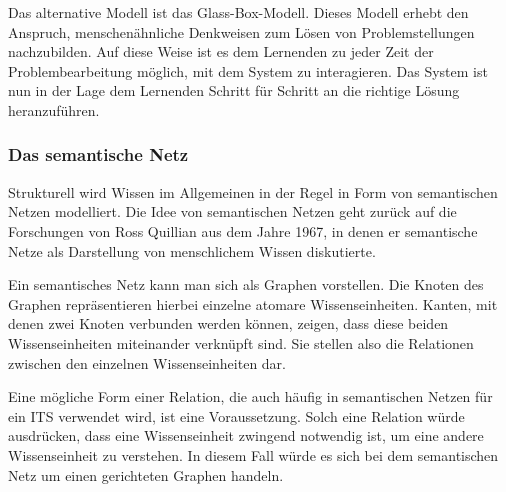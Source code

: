 Das alternative Modell ist das \glqq Glass-Box-Modell\grqq .
Dieses Modell erhebt den Anspruch, menschenähnliche Denkweisen zum Lösen von
Problemstellungen nachzubilden. Auf diese Weise ist es dem Lernenden zu jeder Zeit der
Problembearbeitung möglich, mit dem System zu interagieren. Das System ist nun in der Lage
dem Lernenden Schritt für Schritt an die richtige Lösung heranzuführen.


\subsubsection{Das semantische Netz}

Strukturell wird Wissen im Allgemeinen in der Regel in Form von semantischen Netzen modelliert.
Die Idee von semantischen Netzen geht zurück auf die Forschungen von Ross Quillian aus dem Jahre 1967,
in denen er semantische Netze als Darstellung von menschlichem Wissen diskutierte.

Ein semantisches Netz kann man sich als Graphen vorstellen. Die Knoten des Graphen repräsentieren
hierbei einzelne atomare Wissenseinheiten. Kanten, mit denen zwei Knoten verbunden werden können,
zeigen, dass diese beiden Wissenseinheiten miteinander verknüpft sind. Sie stellen also die Relationen zwischen
den einzelnen Wissenseinheiten dar.\cite[S.5ff]{reichenberger2010}

Eine mögliche Form einer Relation, die auch häufig in semantischen Netzen für ein ITS verwendet wird,
ist eine Voraussetzung. Solch eine Relation würde ausdrücken, dass eine Wissenseinheit zwingend notwendig ist,
um eine andere Wissenseinheit zu verstehen. In diesem Fall würde es sich bei dem semantischen Netz um einen gerichteten Graphen handeln.

\newpage

